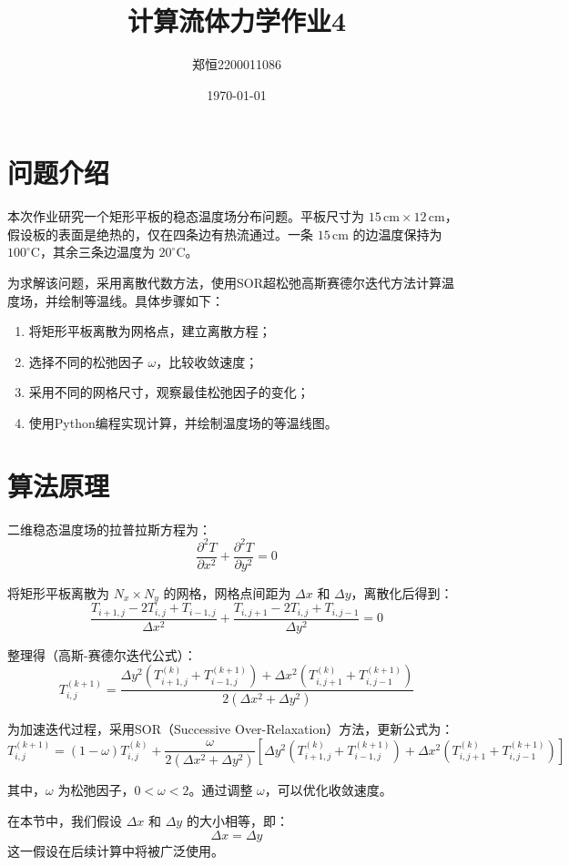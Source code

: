 \documentclass[12pt,a4paper]{article}
\title{计算流体力学作业4}
\author{郑恒2200011086}
\date{\today}
\begin{document}
\maketitle

\section{问题介绍}
本次作业研究一个矩形平板的稳态温度场分布问题。平板尺寸为 $15 \, \text{cm} \times 12 \, \text{cm}$，假设板的表面是绝热的，仅在四条边有热流通过。一条 $15 \, \text{cm}$ 的边温度保持为 $100^\circ \text{C}$，其余三条边温度为 $20^\circ \text{C}$。

为求解该问题，采用离散代数方法，使用SOR超松弛高斯赛德尔迭代方法计算温度场，并绘制等温线。具体步骤如下：
\begin{enumerate}
    \item 将矩形平板离散为网格点，建立离散方程；
    \item 选择不同的松弛因子 $\omega$，比较收敛速度；
    \item 采用不同的网格尺寸，观察最佳松弛因子的变化；
    \item 使用Python编程实现计算，并绘制温度场的等温线图。
\end{enumerate}

\section{算法原理}
二维稳态温度场的拉普拉斯方程为：
\[
\frac{\partial^2 T}{\partial x^2} + \frac{\partial^2 T}{\partial y^2} = 0
\]

将矩形平板离散为 $N_x \times N_y$ 的网格，网格点间距为 $\Delta x$ 和 $\Delta y$，离散化后得到：
\[
\frac{T_{i+1,j} - 2T_{i,j} + T_{i-1,j}}{\Delta x^2} + \frac{T_{i,j+1} - 2T_{i,j} + T_{i,j-1}}{\Delta y^2} = 0
\]

整理得（高斯-赛德尔迭代公式）：
\[
T_{i,j}^{(k+1)} = \frac{\Delta y^2 (T_{i+1,j}^{(k)} + T_{i-1,j}^{(k+1)}) + \Delta x^2 (T_{i,j+1}^{(k)} + T_{i,j-1}^{(k+1)})}{2 (\Delta x^2 + \Delta y^2)}
\]

为加速迭代过程，采用SOR（Successive Over-Relaxation）方法，更新公式为：
\[
T_{i,j}^{(k+1)} = (1 - \omega) T_{i,j}^{(k)} + \frac{\omega}{2 (\Delta x^2 + \Delta y^2)} \left[ \Delta y^2 (T_{i+1,j}^{(k)} + T_{i-1,j}^{(k+1)}) + \Delta x^2 (T_{i,j+1}^{(k)} + T_{i,j-1}^{(k+1)}) \right]
\]

其中，$\omega$ 为松弛因子，$0 < \omega < 2$。通过调整 $\omega$，可以优化收敛速度。

在本节中，我们假设 $\Delta x$ 和 $\Delta y$ 的大小相等，即：
\[
\Delta x = \Delta y
\]
这一假设在后续计算中将被广泛使用。
\end{document}
